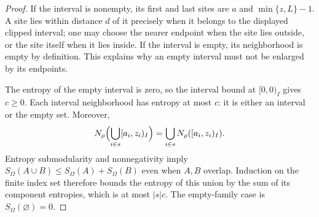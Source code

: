 \begin{proof}
    \leanok
    If the interval is nonempty, its first and last
    sites are $a$ and $\min\{z,L\}-1$. A site lies within distance $d$
    of it precisely when it belongs to the displayed clipped interval;
    one may choose the nearer endpoint when the site lies outside, or
    the site itself when it lies inside. If the interval is empty,
    its neighborhood is empty by definition. This explains why an
    empty interval must not be enlarged by its endpoints.

    The entropy of the empty interval is zero, so the interval bound
    at $[0,0)_I$ gives $c\ge0$.
    Each interval neighborhood has entropy at most $c$: it is either
    an interval or the empty set. Moreover,
    \begin{align}
        N_\rho\Bigl(\bigcup_{i\in s}[a_i,z_i)_I\Bigr)
        =\bigcup_{i\in s}N_\rho([a_i,z_i)_I).
    \end{align}
    Entropy submodularity and nonnegativity imply
    $S_\Omega(A\cup B)\le S_\Omega(A)+S_\Omega(B)$ even when $A,B$
    overlap. Induction on the finite index set therefore bounds the
    entropy of this union by the sum of its component entropies,
    which is at most $|s|c$. The empty-family case is $S_\Omega(\varnothing)=0$.
\end{proof}

